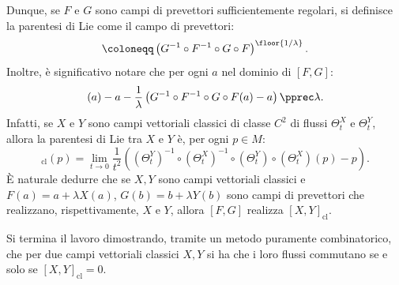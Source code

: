 Dunque, se $ F $ e $ G $ sono campi di prevettori sufficientemente regolari, si definisce la parentesi di Lie come il campo di prevettori: \begin{equation*}
    [F,G] \coloneqq \left(G^{-1}\circ F^{-1}\circ G\circ F\right)^{\floor{1/\lambda}}.
\end{equation*}Inoltre, è significativo notare che per ogni $ a $ nel dominio di $ [F,G] $: \begin{equation*}
    [F,G](a) - a - \frac{1}{\lambda}\left(G^{-1}\circ F^{-1}\circ G\circ F(a)-a\right)\pprec \lambda.
\end{equation*}Infatti, se $ X $ e $ Y $ sono campi vettoriali classici di classe $ C^{2} $ di flussi $ \Theta^{X}_t  $ e $ \Theta^{Y}_t $, allora la parentesi di Lie tra $ X $ e $ Y $ è, per ogni $ p \in M $: \begin{equation*}
    [X,Y]_{\text{cl}}(p) = \lim_{t\to 0} \frac{1}{t^{2}}\left(\left(\Theta^{Y}_t\right)^{-1}\circ\left(\Theta^{X}_t\right)^{-1}\circ \left(\Theta^{Y}_t\right)\circ \left(\Theta^{X}_t\right)(p)-p\right).
\end{equation*}È naturale dedurre che se $ X,Y $ sono campi vettoriali classici e $ F(a)=a + \lambda X(a) $, $ G(b) = b+\lambda Y(b) $ sono campi di prevettori che realizzano, rispettivamente, $ X $ e $ Y $, allora $ [F,G] $ realizza $ [X,Y]_{\text{cl}} $.

Si termina il lavoro dimostrando, tramite un metodo puramente combinatorico, che per due campi vettoriali classici $ X, Y$ si ha che i loro flussi commutano se e solo se $ [X,Y]_{\text{cl}}=0 $.